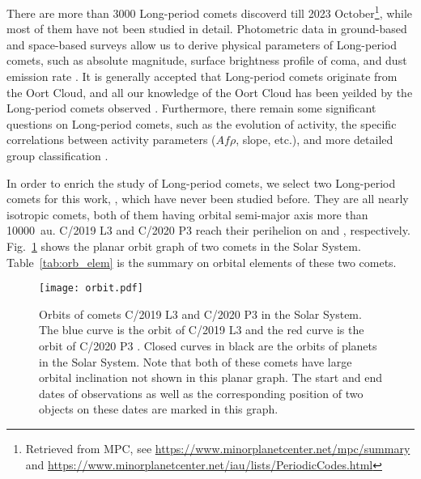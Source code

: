 There are more than \num{3000} Long-period comets discoverd till 2023 October\footnote{Retrieved from MPC, see \url{https://www.minorplanetcenter.net/mpc/summary} and \url{https://www.minorplanetcenter.net/iau/lists/PeriodicCodes.html}}, while most of them have not been studied in detail. Photometric data in ground-based and space-based surveys allow us to derive physical parameters of Long-period comets, such as absolute magnitude, surface brightness profile of coma, and dust emission rate \citep{bauer_comet_2022, betzler_activity_2023}. It is generally accepted that Long-period comets originate from the Oort Cloud, and all our knowledge of the Oort Cloud has been yeilded by the Long-period comets observed \citep{fouchard_what_2023}. Furthermore, there remain some significant questions on Long-period comets, such as the evolution of activity, the specific correlations between activity parameters ($Af\rho$, slope, etc.), and more detailed group classification \citep{sarneczky_activity_2016}. 

In order to enrich the study of Long-period comets, we select two Long-period comets for this work, , which have never been studied before. They are all nearly isotropic comets, both of them having orbital semi-major axis more than {\qty{10000}{\astronomicalunit}}. C/2019 L3 and C/2020 P3 reach their perihelion on  and , respectively. Fig.~\ref{fig:orbit} shows the planar orbit graph of two comets in the Solar System. Table~\ref{tab:orb_elem} is the summary on orbital elements of these two comets. 

\begin{figure}
    \centering
    \texttt{[image: orbit.pdf]}
    \caption{Orbits of comets C/2019 L3  and C/2020 P3  in the Solar System. The blue curve is the orbit of C/2019 L3  and the red curve is the orbit of C/2020 P3 . Closed curves in black are the orbits of planets in the Solar System. Note that both of these comets have large orbital inclination not shown in this planar graph. The start and end dates of observations as well as the corresponding position of two objects on these dates are marked in this graph. }
    \label{fig:orbit}
\end{figure}

